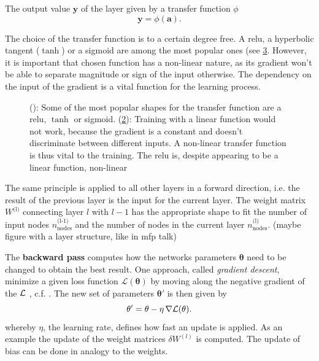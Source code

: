 The output value $\mathbf{y}$ of the layer given by a transfer function $\phi$
\begin{equation}
\label{transferANN}
\mathbf{y} = \phi(\mathbf{a}).
\end{equation}

The choice of the transfer function is to a certain degree free. A \gls{relu}, a hyperbolic tangent ($\tanh$) or a sigmoid are among the most popular ones (see \cref{deeplearning_activation_functions}. However, it is important that chosen function has a non-linear nature, as its gradient won't be able to separate magnitude or sign of the input otherwise. The dependency on the input of the gradient is a vital function for the learning process. 

\begin{figure}
	\begin{subfigure}[c]{0.5\textwidth}
		\centering
		\caption{}
		\label{dltransfer}
	\end{subfigure}
	\begin{subfigure}[c]{0.5\textwidth}
		\centering
		\caption{}
		\label{dltransfergradient}
	\end{subfigure}
	\caption{(): Some of the most popular shapes for the transfer function are a \gls{relu}, $\tanh$ or sigmoid. (\ref{dltransfergradient}): Training with a linear function would not work, because the gradient is a constant and doesn't discriminate between different inputs. A non-linear transfer function is thus vital to the training. The \gls{relu} is, despite appearing to be a linear function, non-linear}
	\label{deeplearning_activation_functions}
	
\end{figure}

The same principle is applied to all other layers in a forward direction, i.e. the result of the previous layer is the input for the current layer. The weight matrix $W^{\text{(l)}}$ connecting layer $l$ with $l-1$ has the appropriate shape to fit the number of input nodes $n^{\text{(l-1)}}_\text{nodes}$ and the number of nodes in the current layer $n^{\text{(l)}}_\text{nodes}$. (maybe figure with a layer structure, like in mfp talk)

\label{backwardpassANN}
The \textbf{backward pass} computes how the networks parameters $\mathbf{\theta}$ need to be changed to obtain the best result. One approach, called \emph{gradient descent}, minimize a given loss function $\mathcal{L}(\mathbf{\theta})$ by moving along the negative gradient of the $\mathcal{L}$ , c.f. \cite{Goodfellow-et-al-2016}. The new set of parameters $\mathbf{\theta'}$ is then given by
\begin{equation}
\mathbf{\theta'} = \mathbf{\theta} - \eta \, \nabla\mathcal{L}(\mathbf{\theta}).
\end{equation}
whereby $\eta$, the learning rate, defines how fast an update is applied. As an example the update of the weight matrices $\delta W^{(l)}$ is computed. The update of bias can be done in analogy to the weights. 

